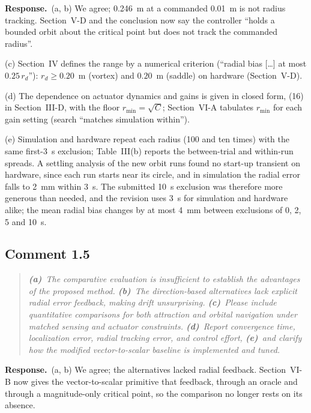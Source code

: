 \documentclass[10pt]{article}
\newcommand{\rev}[1]{#1}                             %
\newcommand{\resp}{\par\textbf{Response.}~}
\begin{document}
\resp (a, b) We agree; 0.246~m at a commanded 0.01~m is not radius tracking. Section~V-D and the conclusion now say the controller ``holds a bounded orbit about the critical point but does not track the commanded radius''.

(c) Section~IV defines the range by a numerical criterion (``radial bias [\ldots] at most $0.25\,r_d$''): $r_d \ge \rev{0.20}$~m (vortex) and $\rev{0.20}$~m (saddle) on hardware (Section~V-D).

(d) The dependence on actuator dynamics and gains is given in closed form, (16) in Section~III-D, with the floor $r_{\min} = \sqrt{C}$; Section~VI-A tabulates $r_{\min}$ for each gain setting (search ``matches simulation within'').

(e) Simulation and hardware repeat each radius (\rev{100} and \rev{ten} times) with the same first-\rev{3}~s exclusion; Table~III(b) reports the between-trial and within-run spreads. A settling analysis of the new orbit runs found no start-up transient on hardware, since each run starts near its circle, and in simulation the radial error falls to 2~mm within 3~s. The submitted 10~s exclusion was therefore more generous than needed, and the revision uses 3~s for simulation and hardware alike; the mean radial bias changes by at most 4~mm between exclusions of 0, 2, 5 and 10~s.

\subsection*{Comment 1.5}

\begin{quote}\itshape
\textbf{(a)}~The comparative evaluation is insufficient to establish the advantages of the proposed method.
\textbf{(b)}~The direction-based alternatives lack explicit radial error feedback, making drift unsurprising.
\textbf{(c)}~Please include quantitative comparisons for both attraction and orbital navigation under matched sensing and actuator constraints.
\textbf{(d)}~Report convergence time, localization error, radial tracking error, and control effort,
\textbf{(e)}~and clarify how the modified vector-to-scalar baseline is implemented and tuned.
\end{quote}

\resp (a, b) We agree; the alternatives lacked radial feedback. Section~VI-B now gives the vector-to-scalar primitive that feedback, through an oracle and through a magnitude-only critical point, so the comparison no longer rests on its absence.
\end{document}
